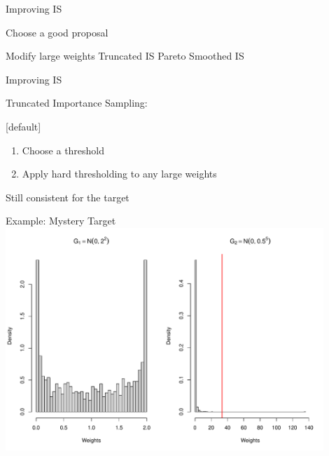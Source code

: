 \documentclass[14pt]{beamer}
\begin{document}


\begin{frame}{Improving IS}
    \begin{outline}
        \1 Choose a good proposal \newline
        
        \1 Modify large weights        
            \2 Truncated IS
            \2 Pareto Smoothed IS
    \end{outline}
\end{frame}

\begin{frame}{Improving IS}
    \begin{outline}
        \1 Truncated Importance Sampling:
            \2 \citep{Ion08} \newline
    \end{outline}

    [default]
    \begin{enumerate}
        \item Choose a threshold
        \item Apply hard thresholding to any large weights \newline
    \end{enumerate}
    \begin{outline}
        \1 Still consistent for the target
    \end{outline}
\end{frame}

\begin{frame}{Example: Mystery Target}
    \centering
    \includegraphics[height=0.9\textheight, width=0.9\textwidth, keepaspectratio]{Figures/Wt Hist - Thresh.pdf}
\end{frame}
\end{document}
